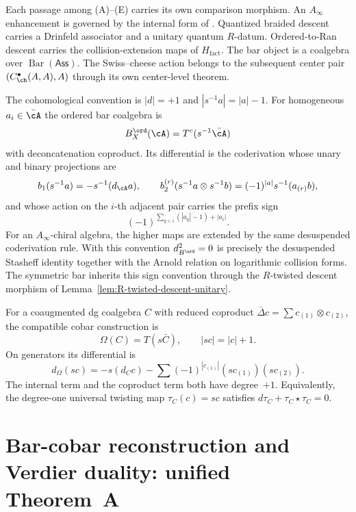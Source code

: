 Each passage among (A)--(E) carries its own comparison morphism.  An
$A_\infty$ enhancement is governed by the internal form of
\cite[Proposition~11.4.4]{LV12}.  Quantized braided descent carries a
Drinfeld associator and a unitary quantum $R$-datum.  Ordered-to-Ran
descent carries the collision-extension maps of
$H_{\mathrm{fact}}$.  The bar object is a coalgebra over
$\operatorname{Bar}(\mathsf{Ass})$.  The Swiss--cheese action belongs
to the subsequent center pair
$(C^\bullet_{\ch}(A,A),A)$ through its own center-level theorem.

\begin{convention}
\label{conv:A-infinity-2-ordered-bar-signs}
The cohomological convention is $|d|=+1$ and
$|s^{-1}a|=|a|-1$. For homogeneous $a_i\in\bar\cA$ the ordered bar
coalgebra is
\[
B_X^{\ord}(\cA)=T^c(s^{-1}\bar\cA)
\]
with deconcatenation coproduct. Its differential is the coderivation
whose unary and binary projections are
\[
b_1(s^{-1}a)=-s^{-1}(d_\cA a),\qquad
b_2^{(r)}(s^{-1}a\otimes s^{-1}b)
=(-1)^{|a|}s^{-1}(a_{(r)}b),
\]
and whose action on the $i$-th adjacent pair carries the prefix sign
\[
(-1)^{\sum_{q<i}(|a_q|-1)+|a_i|}.
\]
For an $A_\infty$-chiral algebra, the higher maps are extended by the
same desuspended coderivation rule. With this convention
$d_{B^{\ord}}^2=0$ is precisely the desuspended Stasheff identity
together with the Arnold relation on logarithmic collision forms.
The symmetric bar inherits this sign convention through the
$R$-twisted descent morphism of
Lemma~\ref{lem:R-twisted-descent-unitary}.

For a coaugmented dg coalgebra $C$ with reduced coproduct
$\bar\Delta c=\sum c_{(1)}\otimes c_{(2)}$, the compatible cobar
construction is
\[
 \Omega(C)=T(s\bar C),\qquad |sc|=|c|+1.
\]
On generators its differential is
\[
 d_{\Omega}(sc)
 =-s(d_Cc)-\sum(-1)^{|c_{(1)}|}
   (sc_{(1)})(sc_{(2)}).
\]
The internal term and the coproduct term both have degree~$+1$.
Equivalently, the degree-one universal twisting map
$\tau_C(c)=sc$ satisfies
$d\tau_C+\tau_C\star\tau_C=0$.
\end{convention}

\section{Bar-cobar reconstruction and Verdier duality: unified Theorem~A}\label{sec:ainf2-koszul-reflection}

